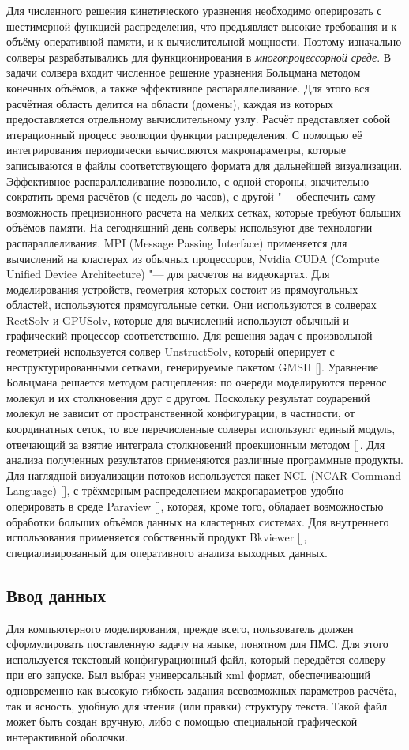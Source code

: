 Для численного решения кинетического уравнения необходимо оперировать с шестимерной функцией распределения,
что предъявляет высокие требования и к объёму оперативной памяти, и к вычислительной мощности.
Поэтому изначально солверы разрабатывались для функционирования в \textit{многопроцессорной среде}.
В задачи солвера входит численное решение уравнения Больцмана методом конечных объёмов, а также эффективное распараллеливание.
Для этого вся расчётная область делится на области (домены), каждая из которых предоставляется отдельному вычислительному узлу.
Расчёт представляет собой итерационный процесс эволюции функции распределения.
С помощью её интегрирования периодически вычисляются макропараметры, которые записываются в файлы соответствующего формата для дальнейшей визуализации.
Эффективное распараллеливание позволило, с одной стороны, значительно сократить время расчётов (с недель до часов),
с другой "--- обеспечить саму возможность прецизионного расчета на мелких сетках, которые требуют больших объёмов памяти.
На сегодняшний день солверы используют две технологии распараллеливания.
MPI (Message Passing Interface) применяется для вычислений на кластерах из обычных процессоров,
Nvidia CUDA (Compute Unified Device Architecture) "--- для расчетов на видеокартах.
Для моделирования устройств, геометрия которых состоит из прямоугольных областей, используются прямоугольные сетки.
Они используются в солверах RectSolv и GPUSolv, которые для вычислений используют обычный и графический процессор соответственно.
Для решения задач с произвольной геометрией используется солвер UnstructSolv, который оперирует с неструктурированными сетками,
генерируемые пакетом GMSH [].
Уравнение Больцмана решается методом расщепления: по очереди моделируются перенос молекул и их столкновения друг с другом.
Поскольку результат соударений молекул не зависит от пространственной конфигурации, в частности, от координатных сеток,
то все перечисленные солверы используют единый модуль, отвечающий за взятие интеграла столкновений проекционным методом [].
Для анализа полученных результатов применяются различные программные продукты.
Для наглядной визуализации потоков используется пакет NCL (NCAR Command Language) [],
с трёхмерным распределением макропараметров удобно оперировать в среде Paraview [],
которая, кроме того, обладает возможностью обработки больших объёмов данных на кластерных системах.
Для внутреннего использования применяется собственный продукт Bkviewer [], специализированный для оперативного анализа выходных данных.

\subsection{Ввод данных}
Для компьютерного моделирования, прежде всего, пользователь должен сформулировать поставленную задачу на языке, понятном для ПМС.
Для этого используется текстовый конфигурационный файл, который передаётся солверу при его запуске.
Был выбран универсальный xml формат, обеспечивающий одновременно как высокую гибкость задания всевозможных параметров расчёта,
так и ясность, удобную для чтения (или правки) структуру текста.
Такой файл может быть создан вручную, либо с помощью специальной графической интерактивной оболочки.

